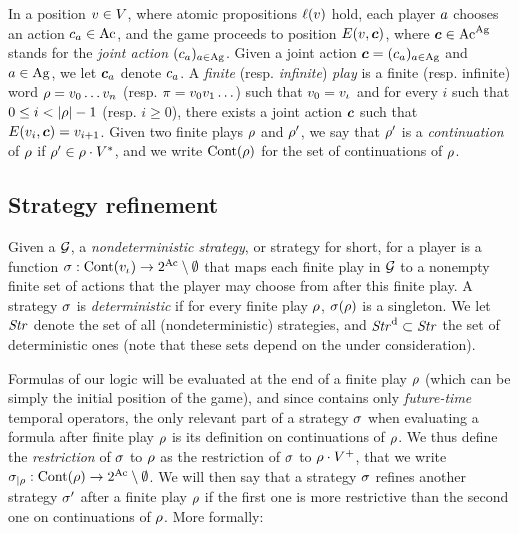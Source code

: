 
In a position $v\in V$, where atomic propositions $\ell(v)$
hold, each player $a$ chooses an action $c_a\in\textnormal{Ac}$, 
and the game proceeds to position
$E(v, \bm{c})$, where $\bm{c}\in \textnormal{Ac}^{\textnormal{Ag}}$ stands for the \emph{joint action}
$(c_a)_{a\in\textnormal{Ag}}$. Given a joint action
$\bm{c}=(c_a)_{a\in\textnormal{Ag}}$ and $a\in\textnormal{Ag}$, we let
$\bm{c}_{a}$ denote $c_a$.
A \emph{finite} (resp. \emph{infinite}) \emph{play} is a finite (resp. infinite)
word $\rho=v_{0}\ldots v_{n}$ (resp. $\pi=v_{0} v_{1}\ldots$)
such that $v_0=v_{\iota}$ and for every $i$ such that $0\leq i<|\fplay|-1$ (resp. $i\geq 0$), there exists a joint action $\bm{c}$
such that $E(v_{i}, \bm{c})=v_{i+1}$.
Given two finite plays $\rho$ and $\rho'$, we say that $\rho'$
is a \emph{continuation} of $\rho$ if $\rho'\in\rho\cdot
V^*$, and we write $\text{Cont}(\rho)$ for the set of
continuations of $\rho$.

\subsection{Strategy refinement}
\label{sec-ndstrat}
Given a \CGS $\CGS$, a \emph{nondeterministic strategy}, or strategy
for short, for a player is a
function $\sigma:\text{Cont}(v_{\iota})\to 2^{\textnormal{Ac}}\setminus\emptyset$
that maps each finite play in $\CGS$ to a nonempty finite set of
actions that the player may choose from after this finite play.  A strategy $\sigma$ is
\emph{deterministic} if for every finite play $\rho$,
$\sigma(\rho)$ is a singleton.  We let $\mbox{\emph{Str}}$ denote the set of
all (nondeterministic) strategies, and $\mbox{\emph{Str}}^{\text{d}}\subset\mbox{\emph{Str}}$
the set of deterministic ones (note that these sets depend on the \CGS
under consideration).

Formulas of our logic \SLref will be evaluated at the end of a finite play
$\rho$ (which can be simply the initial position of the game), and
since \SLref contains only \emph{future-time} temporal operators,
the only relevant part of a strategy $\sigma$ when evaluating  a
formula after finite play $\rho$ is its definition on continuations
of $\rho$. We thus define the \emph{restriction} of $\sigma$ to
$\rho$ as the restriction of $\sigma$ to $\rho\cdot V^+$, that we
write ${\sigma}_{|\rho}:\text{Cont}(\rho)\to 2^{\textnormal{Ac}}\setminus\emptyset$.
We will then say that a strategy $\sigma$ refines another strategy
$\sigma'$ after a finite play $\rho$ if the first one is more
restrictive than the second one on continuations of $\rho$. More formally:


